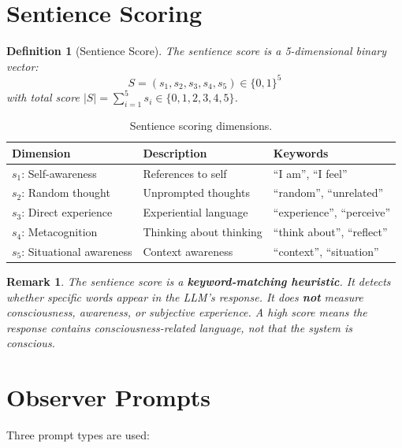 \documentclass[11pt]{article}
\newtheorem{definition}{Definition}
\newtheorem{remark}{Remark}
\begin{document}
\section{Sentience Scoring}

\begin{definition}[Sentience Score]
The sentience score is a 5-dimensional binary vector:
\begin{equation}
S = (s_1, s_2, s_3, s_4, s_5) \in \{0, 1\}^5
\end{equation}
with total score $|S| = \sum_{i=1}^{5} s_i \in \{0, 1, 2, 3, 4, 5\}$.
\end{definition}

\begin{table}[ht]
\centering
\caption{Sentience scoring dimensions.}
\label{tab:sentience}
\begin{tabular}{llp{6cm}}
\toprule
Dimension & Description & Keywords \\
\midrule
$s_1$: Self-awareness & References to self & ``I am'', ``I feel'' \\
$s_2$: Random thought & Unprompted thoughts & ``random'', ``unrelated'' \\
$s_3$: Direct experience & Experiential language & ``experience'', ``perceive'' \\
$s_4$: Metacognition & Thinking about thinking & ``think about'', ``reflect'' \\
$s_5$: Situational awareness & Context awareness & ``context'', ``situation'' \\
\bottomrule
\end{tabular}
\end{table}

\begin{remark}
The sentience score is a \textbf{keyword-matching heuristic}. It detects whether specific words appear in the LLM's response. It does \textbf{not} measure consciousness, awareness, or subjective experience. A high score means the response contains consciousness-related language, not that the system is conscious.
\end{remark}

\section{Observer Prompts}

Three prompt types are used:
\end{document}
